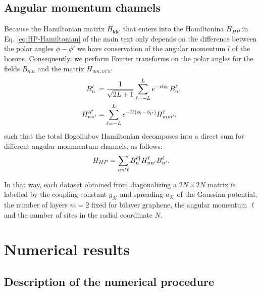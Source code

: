 \documentclass[english,aps,prd,nofootinbib,twocolumn]{revtex4-1}
\begin{document}
\subsection{Angular momentum channels}
Because the Hamiltonian matrix $H_{\mathbf{k k'}}$ that enters into the Hamiltonina $H_{HP}$ in Eq. \eqref{eq:HP-Hamiltonian} of the main text only depends on the difference between the polar angles $\phi-\phi'$ we have conservation of the angular momentum $l$ of the bosons. Consequently, we perform Fourier transforms on the polar angles for the fields $B_{mn}$ and the matrix $H_{mn,m'n'}$
\begin{equation}
\begin{split}
B_{n}^{l\textcolor{white}{\dagger}} &= 
\frac{1}{\sqrt{2L+1}}\sum_{\ell=-L}^{L}
e^{-i \ell \phi_{l}}B_{n}^{\ell} ,
\\
H_{nn'}^{ll'} &= \sum_{\ell=-L}^{L}
e^{-i \ell (\phi_{l }-\phi_{l'})}
H_{mm'}^{\ell},
\end{split}
\end{equation}
such that the total Bogoliubov Hamiltonian decomposes into a direct sum for different angular mommentum channels, as follows:
\begin{equation}
H_{HP} = \sum_{nn'\ell}
B_{n  }^{\ell\textcolor{black}{\dagger}}
H_{nn'}^{\ell}
B_{n' }^{\ell}.
\end{equation}

In that way, each dataset obtained from diagonalizing a $2N\times 2N$ matrix is labelled by the coupling constant $g_{\mathcal{K}}$ and spreading $a_{\mathcal{K}}$ of the Gaussian potential, the number of layers $m=2$ fixed for bilayer graphene, the angular momentum $\ell$ and the number of sites in the radial coordinate $N$.



\section{Numerical results}

\subsection{Description of the numerical procedure}
\label{sect:description-num-proc}
\end{document}
